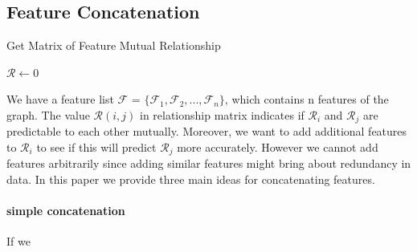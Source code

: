 \documentclass[sigconf]{acmart}
\begin{document}
\subsection{Feature Concatenation}
\begin{algorithm}
  \caption{Get Matrix of Feature Mutual Relationship}
  $\mathcal R \gets 0$\\
  \end{algorithm}
  We have a feature list $\mathcal F$ = $\{ \mathcal F_{1}, \mathcal F_{2},..., \mathcal F_{n}\}$, which contains n 
  features of the graph. The value $\mathcal R(i,j)$ in relationship matrix indicates if $ \mathcal R_{i}$ and
  $\mathcal R_{j}$ are predictable to each other mutually. Moreover, we want to add additional features to $\mathcal R_{i}$
  to see if this will predict $\mathcal R_{j}$ more accurately. However we cannot add features arbitrarily since adding similar features might 
  bring about redundancy in data. In this paper we provide three main ideas for concatenating features.
\paragraph{simple concatenation}
If we 
\end{document}
